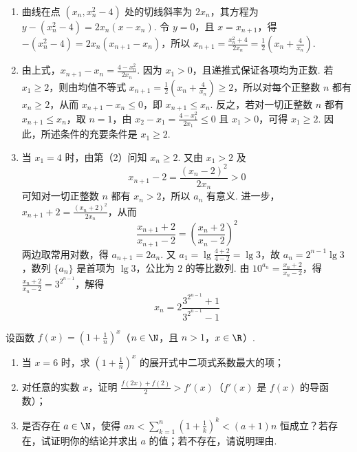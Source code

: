 \begin{solution}
\begin{enumerate}
\item 曲线在点 \((x_n,x_n^2-4)\) 处的切线斜率为 \(2x_n\)，其方程为 \(y-(x_n^2-4)=2x_n(x-x_n)\). 令 \(y=0\)，且 \(x=x_{n+1}\)，得 \(-(x_n^2-4)=2x_n(x_{n+1}-x_n)\)，所以 \(x_{n+1}=\frac{x_n^2+4}{2x_n}=\frac{1}{2}\left(x_n+\frac{4}{x_n}\right)\).
\item 由上式，\(x_{n+1}-x_n=\frac{4-x_n^2}{2x_n}\). 因为 \(x_1>0\)，且递推式保证各项均为正数. 若 \(x_1\geqslant2\)，则由均值不等式 \(x_{n+1}=\frac{1}{2}\left(x_n+\frac{4}{x_n}\right)\geqslant2\)，所以对每个正整数 \(n\) 都有 \(x_n\geqslant2\)，从而 \(x_{n+1}-x_n\leqslant0\)，即 \(x_{n+1}\leqslant x_n\). 反之，若对一切正整数 \(n\) 都有 \(x_{n+1}\leqslant x_n\)，取 \(n=1\)，由 \(x_2-x_1=\frac{4-x_1^2}{2x_1}\leqslant0\) 且 \(x_1>0\)，可得 \(x_1\geqslant2\). 因此，所述条件的充要条件是 \(x_1\geqslant2\).
\item 当 \(x_1=4\) 时，由第（2）问知 \(x_n\geqslant2\). 又由 \(x_1>2\) 及
\[
x_{n+1}-2=\frac{(x_n-2)^2}{2x_n}>0
\]
可知对一切正整数 \(n\) 都有 \(x_n>2\)，所以 \(a_n\) 有意义. 进一步，\(x_{n+1}+2=\frac{(x_n+2)^2}{2x_n}\)，从而
\[
\frac{x_{n+1}+2}{x_{n+1}-2}=\left(\frac{x_n+2}{x_n-2}\right)^2
\]
两边取常用对数，得 \(a_{n+1}=2a_n\). 又 \(a_1=\lg\frac{4+2}{4-2}=\lg3\)，故 \(a_n=2^{n-1}\lg3\)，数列 \(\{a_n\}\) 是首项为 \(\lg3\)，公比为 \(2\) 的等比数列. 由 \(10^{a_n}=\frac{x_n+2}{x_n-2}\)，得 \(\frac{x_n+2}{x_n-2}=3^{2^{n-1}}\)，解得
\[
x_n=2\frac{3^{2^{n-1}}+1}{3^{2^{n-1}}-1}
\]
\end{enumerate}
\end{solution}


\begin{problem}
设函数 \(f(x) = \left(1 + \frac{1}{n}\right)^x\)（\(n \in \N\)，且 \(n > 1\)，\(x \in \R\)）.

\begin{enumerate}
\item 当 \(x = 6\) 时，求 \(\left(1 + \frac{1}{n}\right)^x\) 的展开式中二项式系数最大的项；
\item 对任意的实数 \(x\)，证明 \(\frac{f(2x) + f(2)}{2} > f'(x)\)（\(f'(x)\) 是 \(f(x)\) 的导函数）；
\item 是否存在 \(a \in \N\)，使得 \(an < \sum_{k=1}^{n} \left(1 + \frac{1}{k}\right)^k < (a + 1)n\) 恒成立？若存在，试证明你的结论并求出 \(a\) 的值；若不存在，请说明理由.
\end{enumerate}
\end{problem}

